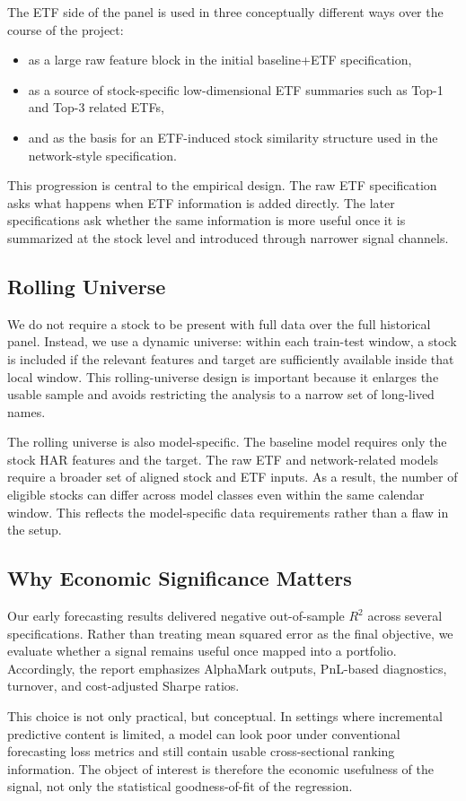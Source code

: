 The ETF side of the panel is used in three conceptually different ways over the course of the project:
\begin{itemize}[leftmargin=1.4em]
  \item as a large raw feature block in the initial baseline+ETF specification,
  \item as a source of stock-specific low-dimensional ETF summaries such as Top-1 and Top-3 related ETFs,
  \item and as the basis for an ETF-induced stock similarity structure used in the network-style specification.
\end{itemize}

This progression is central to the empirical design. The raw ETF specification asks what happens when ETF information is added directly. The later specifications ask whether the same information is more useful once it is summarized at the stock level and introduced through narrower signal channels.

\subsection{Rolling Universe}

We do not require a stock to be present with full data over the full historical panel. Instead, we use a dynamic universe: within each train-test window, a stock is included if the relevant features and target are sufficiently available inside that local window. This rolling-universe design is important because it enlarges the usable sample and avoids restricting the analysis to a narrow set of long-lived names.

The rolling universe is also model-specific. The baseline model requires only the stock HAR features and the target. The raw ETF and network-related models require a broader set of aligned stock and ETF inputs. As a result, the number of eligible stocks can differ across model classes even within the same calendar window. This reflects the model-specific data requirements rather than a flaw in the setup.

\subsection{Why Economic Significance Matters}

Our early forecasting results delivered negative out-of-sample $R^2$ across several specifications. Rather than treating mean squared error as the final objective, we evaluate whether a signal remains useful once mapped into a portfolio. Accordingly, the report emphasizes AlphaMark outputs, PnL-based diagnostics, turnover, and cost-adjusted Sharpe ratios.

This choice is not only practical, but conceptual. In settings where incremental predictive content is limited, a model can look poor under conventional forecasting loss metrics and still contain usable cross-sectional ranking information. The object of interest is therefore the economic usefulness of the signal, not only the statistical goodness-of-fit of the regression.
